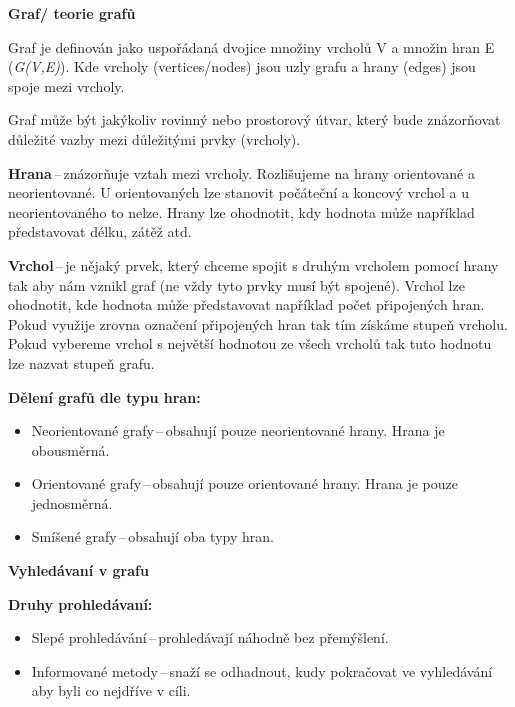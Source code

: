 \begin{Large}\vspace{0,5cm} \textbf{Graf/ teorie grafů}
\end{Large}

Graf je definován jako uspořádaná dvojice množiny vrcholů V a množin hran E (\textit{G(V,E)}). Kde vrcholy (vertices/nodes) jsou uzly grafu a hrany (edges) jsou spoje mezi vrcholy. 

Graf může být jakýkoliv rovinný nebo prostorový útvar, který bude znázorňovat důležité vazby mezi důležitými prvky (vrcholy).

\textbf{Hrana}\,--\,znázorňuje vztah mezi vrcholy. Rozlišujeme na hrany orientované a neorientované. U orientovaných lze stanovit počáteční a koncový vrchol a u neorientovaného to nelze. Hrany lze ohodnotit, kdy hodnota může například představovat délku, zátěž atd.

\textbf{Vrchol}\,--\,je nějaký prvek, který chceme spojit s druhým vrcholem pomocí hrany tak aby nám vznikl graf (ne vždy tyto prvky musí být spojené). Vrchol lze ohodnotit, kde hodnota může představovat například počet připojených hran. Pokud využije zrovna označení připojených hran tak tím získáme stupeň vrcholu. Pokud vybereme vrchol s největší hodnotou ze všech vrcholů tak tuto hodnotu lze nazvat stupeň grafu.

\textbf{Dělení grafů dle typu hran:}
\begin{itemize}
    \item Neorientované grafy\,--\,obsahují pouze neorientované hrany. Hrana je obousměrná.
    \item Orientované grafy\,--\,obsahují pouze orientované hrany. Hrana je pouze jednosměrná.
    \item Smíšené grafy\,--\,obsahují oba typy hran.
\end{itemize}

\begin{Large}\vspace{0,5cm} \textbf{Vyhledávaní v grafu}
\end{Large}

\textbf{Druhy prohledávaní:}
\begin{itemize}
    \item Slepé prohledávání\,--\,prohledávají náhodně bez přemýšlení.
    \item Informované metody\,--\,snaží se odhadnout, kudy pokračovat ve vyhledávání aby byli co nejdříve v cíli.
\end{itemize}


